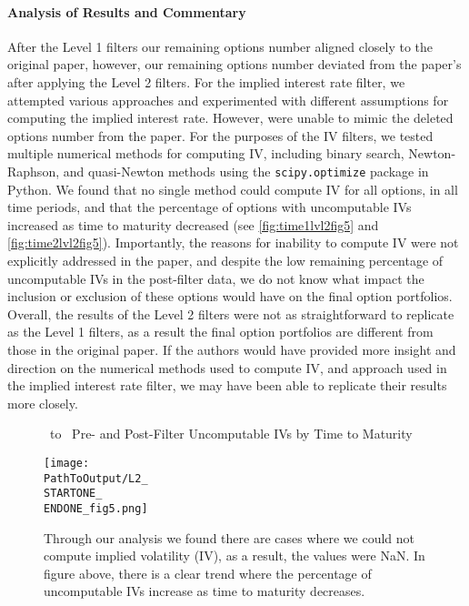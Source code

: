 \paragraph{Analysis of Results and Commentary}
After the Level 1 filters our remaining options number aligned closely to the original paper, however, our remaining options number deviated from the paper's after applying the Level 2 filters. For the implied interest rate filter, we attempted various approaches and experimented with different assumptions for computing the implied interest rate. However, were unable to mimic the deleted options number from the paper. For the purposes of the IV filters, we tested multiple numerical methods for computing IV, including binary search, Newton-Raphson, and quasi-Newton methods using the \texttt{scipy.optimize} package in Python. We found that no single method could compute IV for all options, in all time periods, and that the percentage of options with uncomputable IVs increased as time to maturity decreased (see \autoref{fig:time1lvl2fig5} and \autoref{fig:time2lvl2fig5}). Importantly, the reasons for inability to compute IV were not explicitly addressed in the paper, and despite the low remaining percentage of uncomputable IVs in the post-filter data, we do not know what impact the inclusion or exclusion of these options would have on the final option portfolios. Overall, the results of the Level 2 filters were not as straightforward to replicate as the Level 1 filters, as a result the final option portfolios are different from those in the original paper. If the authors would have provided more insight and direction on the numerical methods used to compute IV, and approach used in the implied interest rate filter, we may have been able to replicate their results more closely.

\vspace{20pt}
\begin{figure}[H] %
  \centering
  \caption{\STARTONE\ to \ENDONE\ Pre- and Post-Filter Uncomputable IVs by Time to Maturity}
  \texttt{[image: \\PathToOutput/L2\_\\STARTONE\_\\ENDONE\_fig5.png]}
  \caption*{Through our analysis we found there are cases where we could not compute implied volatility (IV), as a result, the values were NaN. In figure above, there is a clear trend where the percentage of uncomputable IVs increase as time to maturity decreases.}
  \label{fig:time1lvl2fig5}
\end{figure}

